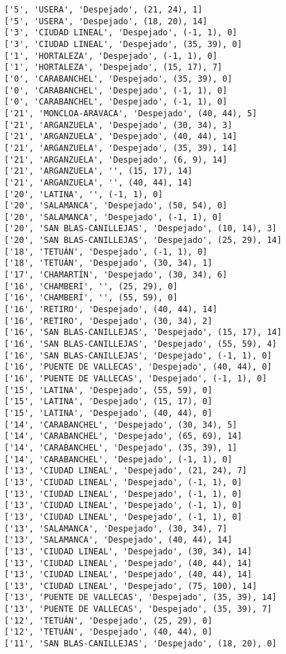 \documentclass[11pt]{article}
\begin{document}
\begin{Verbatim}[commandchars=\\\{\}]
['5', 'USERA', 'Despejado', (21, 24), 1]
['5', 'USERA', 'Despejado', (18, 20), 14]
['3', 'CIUDAD LINEAL', 'Despejado', (-1, 1), 0]
['3', 'CIUDAD LINEAL', 'Despejado', (35, 39), 0]
['1', 'HORTALEZA', 'Despejado', (-1, 1), 0]
['1', 'HORTALEZA', 'Despejado', (15, 17), 7]
['0', 'CARABANCHEL', 'Despejado', (35, 39), 0]
['0', 'CARABANCHEL', 'Despejado', (-1, 1), 0]
['0', 'CARABANCHEL', 'Despejado', (-1, 1), 0]
['21', 'MONCLOA-ARAVACA', 'Despejado', (40, 44), 5]
['21', 'ARGANZUELA', 'Despejado', (30, 34), 3]
['21', 'ARGANZUELA', 'Despejado', (40, 44), 14]
['21', 'ARGANZUELA', 'Despejado', (35, 39), 14]
['21', 'ARGANZUELA', 'Despejado', (6, 9), 14]
['21', 'ARGANZUELA', '', (15, 17), 14]
['21', 'ARGANZUELA', '', (40, 44), 14]
['20', 'LATINA', '', (-1, 1), 0]
['20', 'SALAMANCA', 'Despejado', (50, 54), 0]
['20', 'SALAMANCA', 'Despejado', (-1, 1), 0]
['20', 'SAN BLAS-CANILLEJAS', 'Despejado', (10, 14), 3]
['20', 'SAN BLAS-CANILLEJAS', 'Despejado', (25, 29), 14]
['18', 'TETUÁN', 'Despejado', (-1, 1), 0]
['18', 'TETUÁN', 'Despejado', (30, 34), 1]
['17', 'CHAMARTÍN', 'Despejado', (30, 34), 6]
['16', 'CHAMBERÍ', '', (25, 29), 0]
['16', 'CHAMBERÍ', '', (55, 59), 0]
['16', 'RETIRO', 'Despejado', (40, 44), 14]
['16', 'RETIRO', 'Despejado', (30, 34), 2]
['16', 'SAN BLAS-CANILLEJAS', 'Despejado', (15, 17), 14]
['16', 'SAN BLAS-CANILLEJAS', 'Despejado', (55, 59), 4]
['16', 'SAN BLAS-CANILLEJAS', 'Despejado', (-1, 1), 0]
['16', 'PUENTE DE VALLECAS', 'Despejado', (40, 44), 0]
['16', 'PUENTE DE VALLECAS', 'Despejado', (-1, 1), 0]
['15', 'LATINA', 'Despejado', (55, 59), 0]
['15', 'LATINA', 'Despejado', (15, 17), 0]
['15', 'LATINA', 'Despejado', (40, 44), 0]
['14', 'CARABANCHEL', 'Despejado', (30, 34), 5]
['14', 'CARABANCHEL', 'Despejado', (65, 69), 14]
['14', 'CARABANCHEL', 'Despejado', (35, 39), 1]
['14', 'CARABANCHEL', 'Despejado', (-1, 1), 0]
['13', 'CIUDAD LINEAL', 'Despejado', (21, 24), 7]
['13', 'CIUDAD LINEAL', 'Despejado', (-1, 1), 0]
['13', 'CIUDAD LINEAL', 'Despejado', (-1, 1), 0]
['13', 'CIUDAD LINEAL', 'Despejado', (-1, 1), 0]
['13', 'CIUDAD LINEAL', 'Despejado', (-1, 1), 0]
['13', 'SALAMANCA', 'Despejado', (30, 34), 7]
['13', 'SALAMANCA', 'Despejado', (40, 44), 14]
['13', 'CIUDAD LINEAL', 'Despejado', (30, 34), 14]
['13', 'CIUDAD LINEAL', 'Despejado', (40, 44), 14]
['13', 'CIUDAD LINEAL', 'Despejado', (40, 44), 14]
['13', 'CIUDAD LINEAL', 'Despejado', (75, 100), 14]
['13', 'PUENTE DE VALLECAS', 'Despejado', (35, 39), 14]
['13', 'PUENTE DE VALLECAS', 'Despejado', (35, 39), 7]
['12', 'TETUÁN', 'Despejado', (25, 29), 0]
['12', 'TETUÁN', 'Despejado', (40, 44), 0]
['11', 'SAN BLAS-CANILLEJAS', 'Despejado', (18, 20), 0]

\end{Verbatim}
\end{document}
